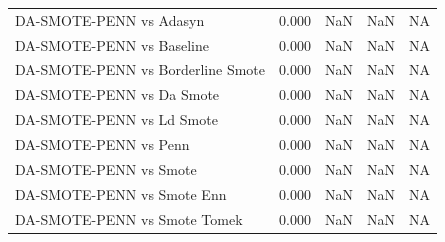 \begin{table}[htb]
\begin{tabular}{lcccc}
\\
DA-SMOTE-PENN vs Adasyn & 0.000 & NaN & NaN & NA
\\
DA-SMOTE-PENN vs Baseline & 0.000 & NaN & NaN & NA
\\
DA-SMOTE-PENN vs Borderline Smote & 0.000 & NaN & NaN & NA
\\
DA-SMOTE-PENN vs Da Smote & 0.000 & NaN & NaN & NA
\\
DA-SMOTE-PENN vs Ld Smote & 0.000 & NaN & NaN & NA
\\
DA-SMOTE-PENN vs Penn & 0.000 & NaN & NaN & NA
\\
DA-SMOTE-PENN vs Smote & 0.000 & NaN & NaN & NA
\\
DA-SMOTE-PENN vs Smote Enn & 0.000 & NaN & NaN & NA
\\
DA-SMOTE-PENN vs Smote Tomek & 0.000 & NaN & NaN & NA
\\
\bottomrule
\end{tabular}
\end{table}
